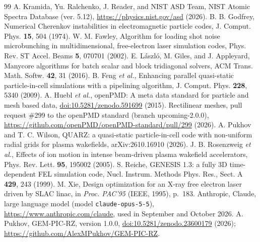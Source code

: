 \documentclass[preprint,12pt]{elsarticle}
\begin{document}
\begin{thebibliography}{99}
 A. Kramida, Yu. Ralchenko, J. Reader, and NIST ASD Team, NIST Atomic Spectra Database (ver. 5.12), \url{https://physics.nist.gov/asd} (2026).
 B. B. Godfrey, Numerical Cherenkov instabilities in electromagnetic particle codes, J. Comput. Phys. \textbf{15}, 504 (1974).
 W. M. Fawley, Algorithm for loading shot noise microbunching in multidimensional, free-electron laser simulation codes, Phys. Rev. ST Accel. Beams \textbf{5}, 070701 (2002).
 E. L\'aszl\'o, M. Giles, and J. Appleyard, Manycore algorithms for batch scalar and block tridiagonal solvers, ACM Trans. Math. Softw. \textbf{42}, 31 (2016).
 B. Feng \textit{et al.}, Enhancing parallel quasi-static particle-in-cell simulations with a pipelining algorithm, J. Comput. Phys. \textbf{228}, 5340 (2009).
 A. Huebl \textit{et al.}, openPMD: A meta data standard for particle and mesh based data, \href{https://doi.org/10.5281/zenodo.591699}{doi:10.5281/zenodo.591699} (2015).
 Rectilinear meshes, pull request \#299 to the openPMD standard (branch upcoming-2.0.0), \url{https://github.com/openPMD/openPMD-standard/pull/299} (2026).
 A. Pukhov and T. C. Wilson, QUARZ: a quasi-static particle-in-cell code with non-uniform radial grids for plasma wakefields, arXiv:2610.16910 (2026).
 J. B. Rosenzweig \textit{et al.}, Effects of ion motion in intense beam-driven plasma wakefield accelerators, Phys. Rev. Lett. \textbf{95}, 195002 (2005).
 S. Reiche, GENESIS 1.3: a fully 3D time-dependent FEL simulation code, Nucl. Instrum. Methods Phys. Res., Sect. A \textbf{429}, 243 (1999).
 M. Xie, Design optimization for an X-ray free electron laser driven by SLAC linac, in \textit{Proc. PAC'95} (IEEE, 1995), p.~183.
 Anthropic, Claude, large language model (model \texttt{claude-opus-5-5}), \url{https://www.anthropic.com/claude}, used in September and October 2026.
 A. Pukhov, GEM-PIC-RZ, version 1.0.0, \href{https://doi.org/10.5281/zenodo.23600179}{doi:10.5281/zenodo.23600179} (2026); \url{https://github.com/AlexMPukhov/GEM-PIC-RZ}.
\end{thebibliography}
\end{document}
